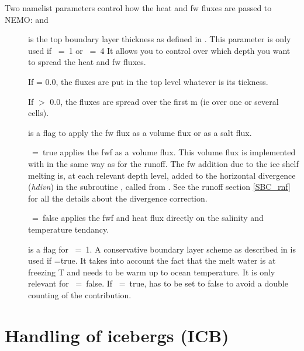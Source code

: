 \documentclass[NEMO_book]{subfiles}
\begin{document}
Two namelist parameters control how the heat and fw fluxes are passed to NEMO:  and 
\begin{description}
\item[] is the top boundary layer thickness as defined in \citet{Losch2008}. 
This parameter is only used if ~=~1 or ~=~4
It allows you to control over which depth you want to spread the heat and fw fluxes. 

If  = 0.0, the fluxes are put in the top level whatever is its tickness. 

If  $>$ 0.0, the fluxes are spread over the first  m (ie over one or several cells).

\item[] is a flag to apply the fw flux as a volume flux or as a salt flux. 

~=~true applies the fwf as a volume flux. This volume flux is implemented with in the same way as for the runoff.
The fw addition due to the ice shelf melting is, at each relevant depth level, added to the horizontal divergence 
(\textit{hdivn}) in the subroutine , called from . 
See the runoff section \ref{SBC_rnf} for all the details about the divergence correction. 

~=~false applies the fwf and heat flux directly on the salinity and temperature tendancy.

\item[] is a flag for ~=~1. A conservative boundary layer scheme as described in \citet{Jenkins2001} 
is used if =true. It takes into account the fact that the melt water is at freezing T and needs to be warm up to ocean temperature. 
It is only relevant for ~=~false. 
If ~=~true,  has to be set to false to avoid a double counting of the contribution. 
 
\end{description}
%
\section{Handling of icebergs (ICB)}
\label{ICB_icebergs}
\end{document}

